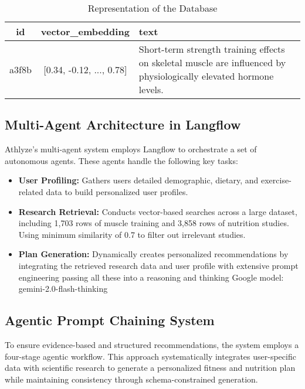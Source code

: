 \documentclass[conference]{IEEEtran}
\begin{document}
\begin{table}[h]
    \caption{Representation of the Database}
    \centering
    \small %
    \begin{tabular}{|c|c|p{2.4cm}|}
        \hline
        \textbf{id} & \textbf{vector\_embedding} &  \textbf{text} \\
        \hline
        a3f8b & [0.34, -0.12, ..., 0.78] & Short-term strength training effects on skeletal muscle are influenced by physiologically elevated hormone levels. \\
        \hline
    \end{tabular}
\end{table}

\subsection{Multi-Agent Architecture in Langflow}
Athlyze's multi-agent system employs Langflow \cite{6} to orchestrate a set of autonomous agents. These agents handle the following key tasks:

\begin{itemize}
    \item \textbf{User Profiling:} Gathers users detailed demographic, dietary, and exercise-related data to build personalized user profiles.
    \item \textbf{Research Retrieval:} Conducts vector-based searches across a large dataset, including 1,703 rows of muscle training and 3,858 rows of nutrition studies. Using minimum similarity of 0.7 to filter out irrelevant studies.
    \item \textbf{Plan Generation:} Dynamically creates personalized recommendations by integrating the retrieved research data and user profile with extensive prompt engineering passing all these into a reasoning and thinking Google model: gemini-2.0-flash-thinking
\end{itemize}

\subsection{Agentic Prompt Chaining System}
To ensure evidence-based and structured recommendations, the system employs a four-stage agentic workflow. This approach systematically integrates user-specific data with scientific research to generate a personalized fitness and nutrition plan while maintaining consistency through schema-constrained generation.
\end{document}

